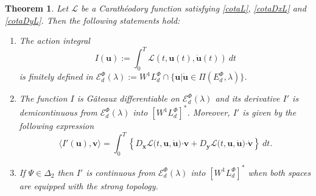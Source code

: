 \documentclass[twoside]{article}
\newtheorem{thm}{Theorem}[section]
\theoremstyle{remark}
\newcommand{\lphi}{L^{\Phi}}
\newcommand{\ephi}{E^{\Phi}}
\newcommand{\wphi}{W^{1}\lphi}
\newcommand{\domi}{\mathcal{E}^{\Phi}_d(\lambda)}
\renewcommand{\b}[1]{\boldsymbol{#1}}
\newcommand{\ccdot}{\b{\cdot}}
\begin{document}
\begin{thm}\label{teorema_acotacion}
Let $\mathcal{L}$ be a Carath\'eodory function satisfying \eqref{cotaL}, \eqref{cotaDxL} and \eqref{cotaDyL}. 
Then the following statements hold:
\begin{enumerate}
\item \label{T1item1} \label{A1} The \emph{action integral}  
\begin{equation}\label{integral_accion}
I(\b{u}):=\int_{0}^T \mathcal{L}(t,\b{u}(t),\b{\dot{u}}(t))\ dt
\end{equation}
is finitely defined in $\domi:=W^{1}\lphi_d\cap\{\b{u}|\b{\dot{u}}\in\Pi(\ephi_d,\lambda)\}$.

\item\label{T1item3} The function  $I$ is G\^ateaux differentiable on $\domi$ and  its derivative $I'$ is demicontinuous from $\domi$  into $\left[\wphi_d \right]^*$. Moreover, $I'$ is given by the following expression
\begin{equation}\label{DerAccion}
\langle  I'(\b{u}),\b{v}\rangle= \int_0^T \left\{D_{\b{x}}\mathcal{L}\big(t,\b{u},\b{\dot{u}}\big)\ccdot \b{v}+ D_{\b{y}}\mathcal{L}\big(t,\b{u},\b{\dot{u}}\big)\ccdot\b{\dot{v}}\right\} \ dt.
\end{equation}

\item\label{T1item4}  If  $\Psi \in \Delta_2$ then 
  $I'$ is continuous from $\domi$ into $\left[\wphi_d\right]^*$ when both spaces are equipped with the strong topology.


\end{enumerate}
\end{thm}
\end{document}
